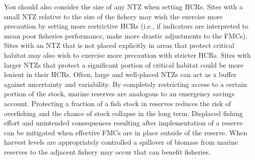 \documentclass[]{book}
\begin{document}
You should also consider the size of any NTZ when setting HCRs. Sites
with a small NTZ relative to the size of the fishery may wish the
exercise more precaution by setting more restrictive HCRs (i.e., if
indicators are interpreted to mean poor fisheries performance, make more
drastic adjustments to the FMCs). Sites with an NTZ that is not placed
explicitly in areas that protect critical habitat may also wish to
exercise more precaution with stricter HCRs. Sites with larger NTZs that
protect a significant portion of critical habitat could be more lenient
in their HCRs. Often, large and well-placed NTZs can act as a buffer
against uncertainty and variability. By completely restricting access to
a certain portion of the stock, marine reserves are analogous to an
emergency savings account. Protecting a fraction of a fish stock in
reserves reduces the risk of overfishing and the chance of stock
collapse in the long term. Displaced fishing effort and unintended
consequences resulting after implementation of a reserve can be
mitigated when effective FMCs are in place outside of the reserve. When
harvest levels are appropriately controlled a spillover of biomass from
marine reserves to the adjacent fishery may occur that can benefit
fisheries.
\end{document}
